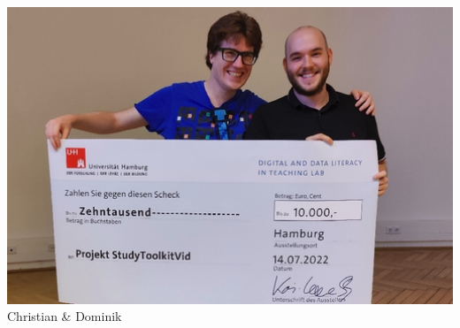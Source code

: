 \documentclass[aspectratio=169]{beamer}
\begin{document}
\begin{frame}[fragile]
\begin{minipage}{.32\textwidth}
        \centering
        \includegraphics[width=1.0\textwidth]{images/proj-2022-ddlitlab-StudyToolkitVid-500x333.jpg} 
        Christian \& Dominik
    \end{minipage}
\end{frame}
\end{document}
